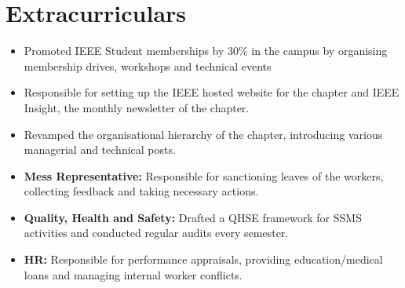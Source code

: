 \section{Extracurriculars}
\vspace{5pt}


        {    
        \begin{itemize}
            \item Promoted IEEE Student memberships by 30\% in the campus by organising membership drives, workshops and technical events 
            \item Responsible for setting up the IEEE hosted website for the chapter and IEEE Insight, the monthly newsletter of the chapter.
            \item Revamped the organisational hierarchy of the chapter, introducing various managerial and technical posts.
        \end{itemize}
        }

    
    \vspace{5pt}
    
        {    
        \begin{itemize}
            \item \textbf{Mess Representative:} Responsible for sanctioning leaves of the workers, collecting feedback and taking necessary actions.
            \item \textbf{Quality, Health and Safety:} Drafted a QHSE framework for SSMS activities and conducted regular audits every semester.
            \item \textbf{HR:} Responsible for performance appraisals, providing education/medical loans and managing internal worker conflicts.
        \end{itemize}
        }
    
    \vspace{5pt}
